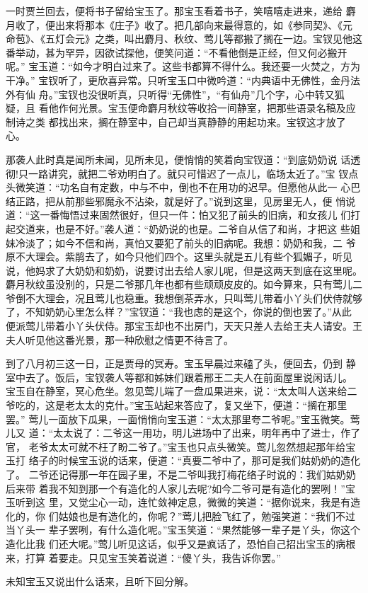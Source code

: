 一时贾兰回去，便将书子留给宝玉了。那宝玉看着书子，笑嘻嘻走进来，递给
麝月收了，便出来将那本《庄子》收了。把几部向来最得意的，如《参同契》、《元
命苞》、《五灯会元》之类，叫出麝月、秋纹、莺儿等都搬了搁在一边。宝钗见他这
番举动，甚为罕异，因欲试探他，便笑问道：“不看他倒是正经，但又何必搬开呢。”
宝玉道：“如今才明白过来了。这些书都算不得什么。我还要一火焚之，方为干净。”
宝钗听了，更欣喜异常。只听宝玉口中微吟道：“内典语中无佛性，金丹法外有仙
舟。”宝钗也没很听真，只听得“无佛性”，“有仙舟”几个字，心中转又狐疑，且
看他作何光景。宝玉便命麝月秋纹等收拾一间静室，把那些语录名稿及应制诗之类
都找出来，搁在静室中，自己却当真静静的用起功来。宝钗这才放了心。

那袭人此时真是闻所未闻，见所未见，便悄悄的笑着向宝钗道：“到底奶奶说
话透彻!只一路讲究，就把二爷劝明白了。就只可惜迟了一点儿，临场太近了。”宝
钗点头微笑道：“功名自有定数，中与不中，倒也不在用功的迟早。但愿他从此一
心巴结正路，把从前那些邪魔永不沾染，就是好了。”说到这里，见房里无人，便
悄说道：“这一番悔悟过来固然很好，但只一件：怕又犯了前头的旧病，和女孩儿
们打起交道来，也是不好。”袭人道：“奶奶说的也是。二爷自从信了和尚，才把这
些姐妹冷淡了；如今不信和尚，真怕又要犯了前头的旧病呢。我想：奶奶和我，二
爷原不大理会。紫鹃去了，如今只他们四个。这里头就是五儿有些个狐媚子，听见
说，他妈求了大奶奶和奶奶，说要讨出去给人家儿呢，但是这两天到底在这里呢。
麝月秋纹虽没别的，只是二爷那几年也都有些顽顽皮皮的。如今算来，只有莺儿二
爷倒不大理会，况且莺儿也稳重。我想倒茶弄水，只叫莺儿带着小丫头们伏侍就够
了，不知奶奶心里怎么样？”宝钗道：“我也虑的是这个，你说的倒也罢了。”从此
便派莺儿带着小丫头伏侍。那宝玉却也不出房门，天天只差人去给王夫人请安。王
夫人听见他这番光景，那一种欣慰之情更不待言了。

到了八月初三这一日，正是贾母的冥寿。宝玉早晨过来磕了头，便回去，仍到
静室中去了。饭后，宝钗袭人等都和姊妹们跟着邢王二夫人在前面屋里说闲话儿。
宝玉自在静室，冥心危坐。忽见莺儿端了一盘瓜果进来，说：“太太叫人送来给二
爷吃的，这是老太太的克什。”宝玉站起来答应了，复又坐下，便道：“搁在那里罢。”
莺儿一面放下瓜果，一面悄悄向宝玉道：“太太那里夸二爷呢。”宝玉微笑。莺儿又
道：“太太说了：二爷这一用功，明儿进场中了出来，明年再中了进士，作了官，
老爷太太可就不枉了盼二爷了。”宝玉也只点头微笑。莺儿忽然想起那年给宝玉打
络子的时候宝玉说的话来，便道：“真要二爷中了，那可是我们姑奶奶的造化了。
二爷还记得那一年在园子里，不是二爷叫我打梅花络子时说的：我们姑奶奶后来带
着我不知到那一个有造化的人家儿去呢?如今二爷可是有造化的罢咧！”宝玉听到这
里，又觉尘心一动，连忙敛神定息，微微的笑道：“据你说来，我是有造化的，你
们姑娘也是有造化的，你呢？”莺儿把脸飞红了，勉强笑道：“我们不过当丫头一
辈子罢咧，有什么造化呢。”宝玉笑道：“果然能够一辈子是丫头，你这个造化比我
们还大呢。”莺儿听见这话，似乎又是疯话了，恐怕自己招出宝玉的病根来，打算
着要走。只见宝玉笑着说道：“傻丫头，我告诉你罢。”

未知宝玉又说出什么话来，且听下回分解。